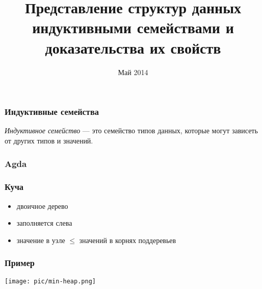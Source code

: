 \documentclass{beamer}
\title[Представление структур данных индуктивными семействами и доказательства их свойств]{Представление структур данных индуктивными семействами и доказательства их свойств}
\institute{НИУ ИТМО}
\date{
Май 2014
}
\begin{document}
\maketitle

\begin{frame}
    \frametitle{Индуктивные семейства}
        \emph{Индуктивное семейство} — это семейство типов данных,
        которые могут зависеть от других типов и значений.
\end{frame}

\begin{frame}
    \frametitle{Agda}
    
\end{frame}

\begin{frame}
    \frametitle{Куча}
    \begin{itemize}
        \item двоичное дерево
        \item заполняется слева
        \item значение в узле $ \leq $ значений в корнях поддеревьев
    \end{itemize}
\end{frame}
\begin{frame}
    \frametitle{Пример}
    \texttt{[image: pic/min-heap.png]}
\end{frame}
\begin{frame}
    
\end{frame}
\end{document}
